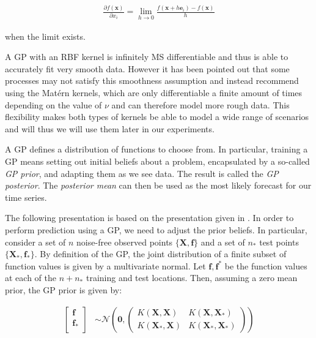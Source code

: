 \documentclass[pdftex,10pt,a4paper,journal]{article}
\theoremstyle{definition}
\theoremstyle{remark}
\newcommand*{\V}[1]{\mathbf{#1}}%
\begin{document}
\begin{multicols}{2}
\begin{align*}
    \frac{\partial f(\V{x})}{\partial{x_i}} = \lim_{h\rightarrow 0} \frac{f(\V{x} + h\V{e}_i) - f(\V{x})}{h}
\end{align*}

when the limit exists. 

\par A GP with an RBF kernel is infinitely MS differentiable and thus is able to accurately fit very smooth data. However it has been pointed out \cite{Stein1999} that some processes may not satisfy this smoothness assumption and instead recommend using the Mat\'ern kernels, which are only differentiable a finite amount of times depending on the value of $\nu$ and can therefore model more rough data. This flexibility makes both types of kernels be able to model a wide range of scenarios and will thus we will use them later in our experiments.

\par A GP defines a distribution of functions to choose from. In particular, training a GP means setting out initial beliefs about a problem, encapsulated by a so-called \textit{GP prior}, and adapting them as we see data. The result is called the \textit{GP posterior}. The \textit{posterior mean} can then be used as the most likely forecast for our time series.

\par The following presentation is based on the presentation given in \cite{Rasmussen2006}. In order to perform prediction using a GP, we need to adjust the prior beliefs. In particular, consider a set of $n$ noise-free observed points $\{\V{X}, \V{f}\}$ and a set of $n_*$ test points $\{\V{X}_*, \V{f}_*\}$. By definition of the GP, the joint distribution of a finite subset of function values is given by a multivariate normal. Let $\V{f}, \V{f}^*$ be the function values at each of the $n+n_*$ training and test locations. Then, assuming a zero mean prior, the GP prior is given by:

\begin{align*}
    \begin{bmatrix}
           \V{f} \\
           \V{f}_* \\
    \end{bmatrix} &\sim \mathcal{N}\left(\V{0}, 
                                        \begin{pmatrix}
                                        K(\V{X}, \V{X}) & K(\V{X}, \V{X}_*)\\
                                        K(\V{X}_*, \V{X}) & K(\V{X}_*, \V{X}_*)
                                        \end{pmatrix}\right)
\end{align*}


\end{multicols}
\end{document}
